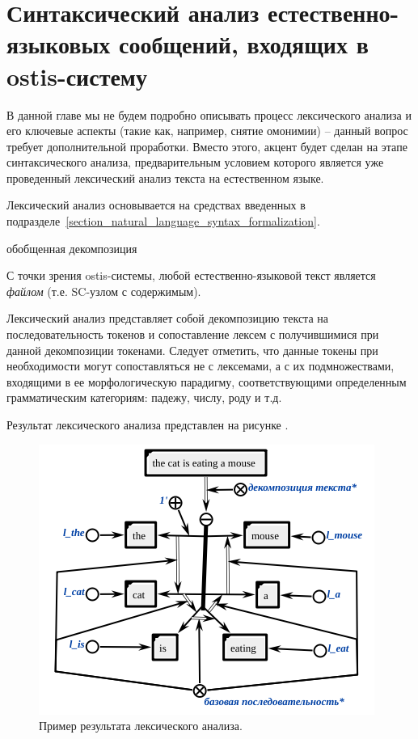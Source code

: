 {\section{Синтаксический анализ естественно-языковых сообщений, входящих в ostis-систему}
\label{section_natural_language_messages_lexical_analysis}

В данной главе мы не будем подробно описывать процесс лексического анализа и его ключевые аспекты (такие как, например, снятие омонимии) – данный вопрос требует дополнительной проработки. Вместо этого, акцент будет сделан на этапе синтаксического анализа, предварительным условием которого является уже проведенный лексический анализ текста на естественном языке.

Лексический анализ основывается на средствах введенных в подразделе~\ref{section_natural_language_syntax_formalization}.

\begin{SCn}

    \begin{scnrelfromset}{обобщенная декомпозиция}
    \end{scnrelfromset}

\end{SCn}

С точки зрения ostis-системы, любой естественно-языковой текст является \textit{файлом} (т.е. SC-узлом с содержимым).

Лексический анализ представляет собой декомпозицию текста на последовательность токенов и сопоставление лексем с получившимися при данной декомпозиции токенами.
Следует отметить, что данные токены при необходимости могут сопоставляться не с лексемами, а с их подмножествами, входящими в ее морфологическую парадигму, соответствующими определенным грамматическим категориям: падежу, числу, роду и т.д.

Результат лексического анализа представлен на рисунке \textit{}.

\begin{figure}[h]
    \centering
    \includegraphics[scale=0.8]{images/part4/chapter_nl_interfaces/lexical}
    \caption{Пример результата лексического анализа.}
    \label{fig:lexical_result}
\end{figure}

}
